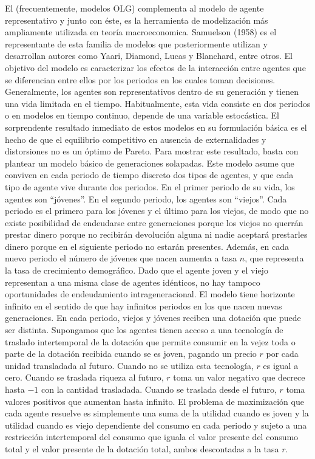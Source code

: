 \documentclass{nuevotema}
\begin{document}
El  (frecuentemente, modelos OLG) complementa al modelo de agente representativo y junto con éste, es la herramienta de modelización más ampliamente utilizada en teoría macroeconomica. Samuelson (1958) es el representante de esta familia de modelos que posteriormente utilizan y desarrollan autores como Yaari, Diamond, Lucas y Blanchard, entre otros. El objetivo del modelo es caracterizar los efectos de la interacción entre agentes que se diferencian entre ellos por los periodos en los cuales toman decisiones. Generalmente, los agentes son representativos dentro de su generación y tienen una vida limitada en el tiempo. Habitualmente, esta vida consiste en dos periodos o en modelos en tiempo continuo, depende de una variable estocástica. El sorprendente resultado inmediato de estos modelos en su formulación básica es el hecho de que el equilibrio competitivo en ausencia de externalidades y distorsiones no es un óptimo de Pareto. Para mostrar este resultado, basta con plantear un modelo básico de generaciones solapadas. Este modelo asume que conviven en cada periodo de tiempo discreto dos tipos de agentes, y que cada tipo de agente vive durante dos periodos. En el primer periodo de su vida, los agentes son ``jóvenes''. En el segundo periodo, los agentes son ``viejos''. Cada periodo es el primero para los jóvenes y el último para los viejos, de modo que no existe posibilidad de endeudarse entre generaciones porque los viejos no querrán prestar dinero porque no recibirán devolución alguna ni nadie aceptará prestarles dinero porque en el siguiente periodo no estarán presentes. Además, en cada nuevo periodo el número de jóvenes que nacen aumenta a tasa $n$, que representa la tasa de crecimiento demográfico. Dado que el agente joven y el viejo representan a una misma clase de agentes idénticos, no hay tampoco oportunidades de endeudamiento intrageneracional. El modelo tiene horizonte infinito en el sentido de que hay infinitos periodos en los que nacen nuevas generaciones. En cada periodo, viejos y jóvenes reciben una dotación que puede ser distinta. Supongamos que los agentes tienen acceso a una tecnología de traslado intertemporal de la dotación que permite consumir en la vejez toda o parte de la dotación recibida cuando se es joven, pagando un precio $r$ por cada unidad transladada al futuro. Cuando no se utiliza esta tecnología, $r$ es igual a cero. Cuando se traslada riqueza al futuro, $r$ toma un valor negativo que decrece hasta $-1$ con la cantidad trasladada. Cuando se traslada desde el futuro, $r$ toma valores positivos que aumentan hasta infinito. El problema de maximización que cada agente resuelve es simplemente una suma de la utilidad cuando es joven y la utilidad cuando es viejo dependiente del consumo en cada periodo y sujeto a una restricción intertemporal del consumo que iguala el valor presente del consumo total y el valor presente de la dotación total, ambos descontadas a la tasa $r$. 
\end{document}
